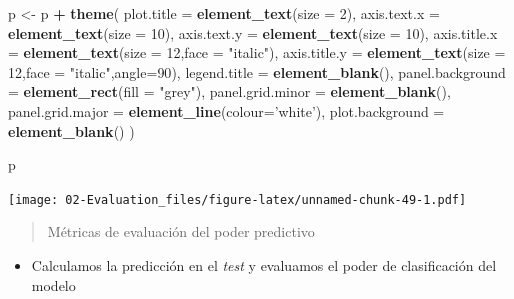 \documentclass[]{book}
\newenvironment{Shaded}{\begin{snugshade}}{\end{snugshade}}
\newcommand{\DataTypeTok}[1]{\textcolor[rgb]{0.13,0.29,0.53}{#1}}
\newcommand{\DecValTok}[1]{\textcolor[rgb]{0.00,0.00,0.81}{#1}}
\newcommand{\KeywordTok}[1]{\textcolor[rgb]{0.13,0.29,0.53}{\textbf{#1}}}
\newcommand{\NormalTok}[1]{#1}
\newcommand{\OperatorTok}[1]{\textcolor[rgb]{0.81,0.36,0.00}{\textbf{#1}}}
\newcommand{\StringTok}[1]{\textcolor[rgb]{0.31,0.60,0.02}{#1}}
\providecommand{\tightlist}{%
  \setlength{\itemsep}{0pt}\setlength{\parskip}{0pt}}
\begin{document}
\begin{Shaded}
\begin{Highlighting}[]
\NormalTok{p <-}\StringTok{ }\NormalTok{p }\OperatorTok{+}\StringTok{ }\KeywordTok{theme}\NormalTok{(}
  \DataTypeTok{plot.title   =} \KeywordTok{element_text}\NormalTok{(}\DataTypeTok{size =} \DecValTok{2}\NormalTok{),}
  \DataTypeTok{axis.text.x  =} \KeywordTok{element_text}\NormalTok{(}\DataTypeTok{size =} \DecValTok{10}\NormalTok{),}
  \DataTypeTok{axis.text.y  =} \KeywordTok{element_text}\NormalTok{(}\DataTypeTok{size =} \DecValTok{10}\NormalTok{),}
  \DataTypeTok{axis.title.x =} \KeywordTok{element_text}\NormalTok{(}\DataTypeTok{size =} \DecValTok{12}\NormalTok{,}\DataTypeTok{face =} \StringTok{"italic"}\NormalTok{),}
  \DataTypeTok{axis.title.y =} \KeywordTok{element_text}\NormalTok{(}\DataTypeTok{size =} \DecValTok{12}\NormalTok{,}\DataTypeTok{face =} \StringTok{"italic"}\NormalTok{,}\DataTypeTok{angle=}\DecValTok{90}\NormalTok{),}
  \DataTypeTok{legend.title     =} \KeywordTok{element_blank}\NormalTok{(), }
  \DataTypeTok{panel.background =} \KeywordTok{element_rect}\NormalTok{(}\DataTypeTok{fill =} \StringTok{"grey"}\NormalTok{),}
  \DataTypeTok{panel.grid.minor =} \KeywordTok{element_blank}\NormalTok{(), }
  \DataTypeTok{panel.grid.major =} \KeywordTok{element_line}\NormalTok{(}\DataTypeTok{colour=}\StringTok{'white'}\NormalTok{),}
  \DataTypeTok{plot.background  =} \KeywordTok{element_blank}\NormalTok{()}
\NormalTok{)}

\NormalTok{p}
\end{Highlighting}
\end{Shaded}

\texttt{[image: 02-Evaluation\_files/figure-latex/unnamed-chunk-49-1.pdf]}

\begin{quote}
Métricas de evaluación del poder predictivo
\end{quote}

\begin{itemize}
\tightlist
\item
  Calculamos la predicción en el \emph{test} y evaluamos el poder de clasificación del modelo
\end{itemize}

\begin{Shaded}
\end{Shaded}
\end{document}
